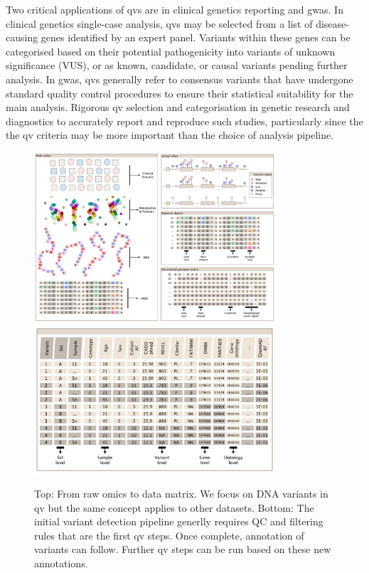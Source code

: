 Two critical applications of  \ac{qv}s are in clinical genetics reporting and \ac{gwas}. 
In clinical genetics single-case analysis, \ac{qv}s may be selected from a list of disease-causing genes identified by an expert panel. 
Variants within these genes can be categorised based on their potential pathogenicity into variants of unknown significance (VUS), or as known, candidate, or causal variants pending further analysis. 
In \ac{gwas}, \ac{qv}s generally refer to consensus variants that have undergone standard quality control procedures to ensure their statistical suitability for the main analysis.
Rigorous \ac{qv} selection and categorisation in genetic research and diagnostics to accurately report and reproduce such studies, particularly since the the \ac{qv} criteria may be more important than the choice of analysis pipeline. 

\begin{figure}[h!]
    \centering
   \includegraphics[width=0.8\textwidth]{./images/candidate_variants_sequence_to_matrix.pdf}
      \includegraphics[width=0.8\textwidth]{./images/candidate_variants_sequence_annotation.pdf}
    \caption{Top: From raw omics to data matrix.  We focus on DNA variants in \ac{qv} but the same concept applies to other datasets.
    Bottom: The initial variant detection pipeline generlly requires QC and filtering rules that are the first \ac{qv} steps. Once complete, annotation of variants can follow. Further \ac{qv} steps can be run based on these new annotations.}
        \label{fig:candidate_variants_sequence_annotation}
\end{figure}

